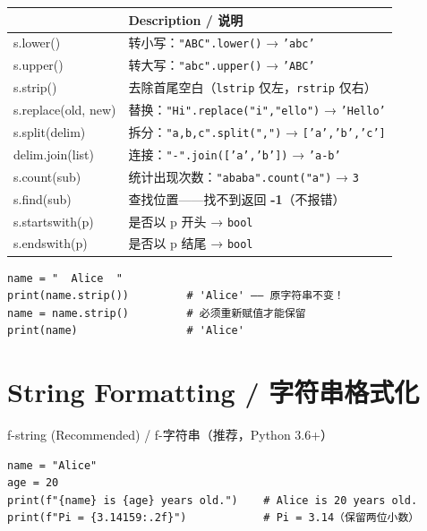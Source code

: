 \documentclass[11pt,a4paper]{report}
\let\oldtexttt\texttt
\renewcommand{\texttt}[1]{\textcolor{mainblue}{\oldtexttt{#1}}}
\begin{document}
\medskip
\renewcommand{\arraystretch}{1.5}
\centering
\begin{tabularx}{\textwidth}{@{}>{\ttfamily}l>{\raggedright\arraybackslash}X@{}}
\toprule
\multicolumn{1}{@{}l}{\textbf{Method}} & \textbf{Description / 说明} \\ \midrule
s.lower()               & 转小写：\texttt{"ABC".lower()} → \texttt{'abc'} \\
s.upper()               & 转大写：\texttt{"abc".upper()} → \texttt{'ABC'} \\
s.strip()               & 去除首尾空白（\texttt{lstrip} 仅左，\texttt{rstrip} 仅右） \\
s.replace(old, new)     & 替换：\texttt{"Hi".replace("i","ello")} → \texttt{'Hello'} \\
s.split(delim)          & 拆分：\texttt{"a,b,c".split(",")} → \texttt{['a','b','c']} \\
delim.join(list)        & 连接：\texttt{"-".join(['a','b'])} → \texttt{'a-b'} \\
s.count(sub)            & 统计出现次数：\texttt{"ababa".count("a")} → \texttt{3} \\
s.find(sub)             & 查找位置——找不到返回 \textbf{-1}（不报错） \\
s.startswith(p)         & 是否以 p 开头 → \texttt{bool} \\
s.endswith(p)           & 是否以 p 结尾 → \texttt{bool} \\
\bottomrule
\end{tabularx}
\medskip

\begin{lstlisting}
name = "  Alice  "
print(name.strip())         # 'Alice' —— 原字符串不变！
name = name.strip()         # 必须重新赋值才能保留
print(name)                 # 'Alice'
\end{lstlisting}

\section{String Formatting / 字符串格式化}

\begin{concept}{f-string (Recommended) / f-字符串（推荐，Python 3.6+）}
\begin{lstlisting}
name = "Alice"
age = 20
print(f"{name} is {age} years old.")    # Alice is 20 years old.
print(f"Pi = {3.14159:.2f}")            # Pi = 3.14（保留两位小数）
\end{lstlisting}
\end{concept}
\end{document}
